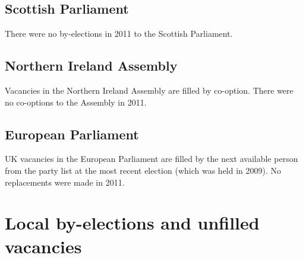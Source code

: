 \section{Scottish Parliament}

There were no by-elections in 2011 to the Scottish Parliament.

\section{Northern Ireland Assembly}

Vacancies in the Northern Ireland Assembly are filled by co-option.  There were no co-options to the Assembly in 2011.

\section{European Parliament}

UK vacancies in the European Parliament are filled by the next available person from the party list at the most recent election (which was held in 2009).  No replacements were made in 2011.

\chapter{Local by-elections and unfilled vacancies}

